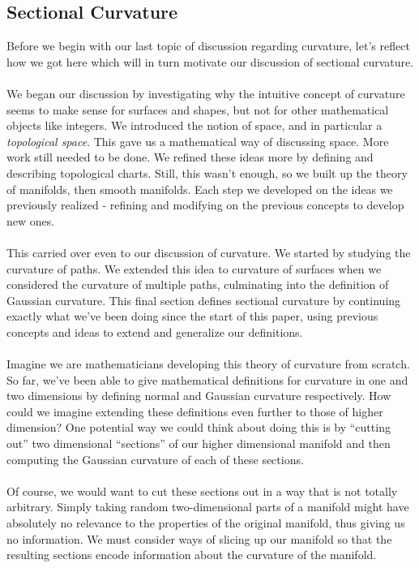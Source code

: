 \documentclass[]{article}
\newcommand\<{\ensuremath{\left\langle}}
\renewcommand\>{\ensuremath{\right\rangle}}
\theoremstyle{definition}
\theoremstyle{definition}
\begin{document}
	\subsection*{Sectional Curvature}
	Before we begin with our last topic of discussion regarding curvature, let's reflect how we got here which will in turn motivate our discussion of sectional curvature.\\
	\\
	We began our discussion by investigating why the intuitive concept of curvature seems to make sense for surfaces and shapes, but not for other mathematical objects like integers. We introduced the notion of space, and in particular a \textit{topological space}. This gave us a mathematical way of discussing space. More work still needed to be done. We refined these ideas more by defining and describing topological charts. Still, this wasn't enough, so we built up the theory of manifolds, then smooth manifolds. Each step we developed on the ideas we previously realized - refining and modifying on the previous concepts to develop new ones.\\
	\\
	This carried over even to our discussion of curvature. We started by studying the curvature of paths. We extended this idea to curvature of surfaces when we considered the curvature of multiple paths, culminating into the definition of Gaussian curvature. This final section defines sectional curvature by continuing exactly what we've been doing since the start of this paper, using previous concepts and ideas to extend and generalize our definitions.\\
	\\
	Imagine we are mathematicians developing this theory of curvature from scratch. So far, we've been able to give mathematical definitions for curvature in one and two dimensions by defining normal and Gaussian curvature respectively. How could we imagine extending these definitions even further to those of higher dimension? One potential way we could think about doing this is by ``cutting out'' two dimensional ``sections'' of our higher dimensional manifold and then computing the Gaussian curvature of each of these sections.\\
	\\
	Of course, we would want to cut these sections out in a way that is not totally arbitrary. Simply taking random two-dimensional parts of a manifold might have absolutely no relevance to the properties of the original manifold, thus giving us no information. We must consider ways of slicing up our manifold so that the resulting sections encode information about the curvature of the manifold.\\
\end{document}
